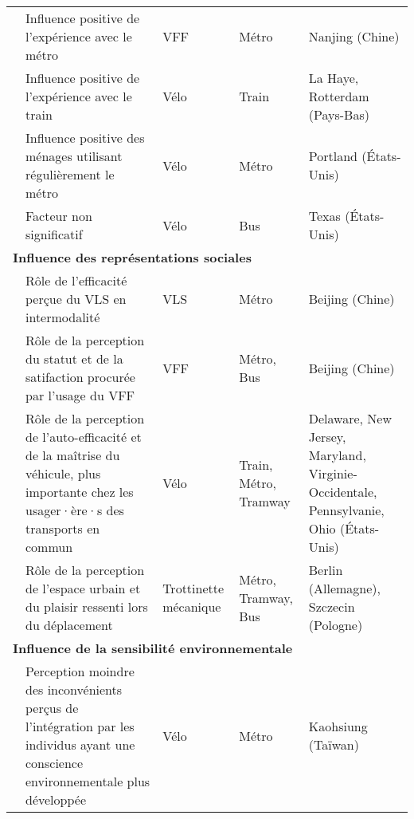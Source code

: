 \begin{longtable}{p{3cm}p{4cm}p{1.5cm}p{1.8cm}p{2.3cm}}
    \small{\textcite{liu_use_2020}}\index{Liu, Yang|pagebf} & \small{Influence positive de l'expérience avec le métro} & \small{VFF} & \small{Métro} & \small{Nanjing (Chine)}\\
    \small{\textcite{la_paix_puello_role_2021}}\index{La Paix Puello, Lissy|pagebf} & \small{Influence positive de l'expérience avec le train} & \small{Vélo} & \small{Train} & \small{La Haye, Rotterdam (Pays-Bas)}\\
    \small{\textcite{singleton_exploring_2014}}\index{Singleton, Patrick A.|pagebf} & \small{Influence positive des ménages utilisant régulièrement le métro} & \small{Vélo} & \small{Métro} & \small{Portland (États-Unis)}\\
    \small{\textcite{taylor_analysis_1996}}\index{Taylor, Dean|pagebf} & \small{Facteur non significatif} & \small{Vélo} & \small{Bus} & \small{Texas (États-Unis)}\\
    \hline
\multicolumn{5}{l}{\textbf{Influence des représentations sociales}}\\
    \small{\textcite{zhao_public_2022}}\index{Zhao, Pengjun|pagebf} & \small{Rôle de l'efficacité perçue du VLS en intermodalité} & \small{VLS} & \small{Métro} & \small{Beijing (Chine)}\\
    \small{\textcite{guo_exploring_2023}}\index{Guo, Dongbo|pagebf} & \small{Rôle de la perception du statut et de la satifaction procurée par l'usage du VFF} & \small{VFF} & \small{Métro, Bus} & \small{Beijing (Chine)}\\
    \small{\textcite{bopp_examining_2015}}\index{Bopp, Melissa|pagebf} & \small{Rôle de la perception de l'auto-efficacité et de la maîtrise du véhicule, plus importante chez les usager·ère·s des transports en commun} & \small{Vélo} & \small{Train, Métro, Tramway} & \small{Delaware, New Jersey, Maryland, Virginie-Occidentale, Pennsylvanie, Ohio (États-Unis)}\\
    \small{\textcite{kostrzewska_towards_2017}} & \small{Rôle de la perception de l'espace urbain et du plaisir ressenti lors du déplacement} & \small{Trottinette mécanique} & \small{Métro, Tramway, Bus} & \small{Berlin (Allemagne), Szczecin (Pologne)}\\
    \hline
\multicolumn{5}{l}{\textbf{Influence de la sensibilité environnementale}}\\
    \small{\textcite{cheng_evaluating_2012}}\index{Cheng, Yung-Hsiang|pagebf} & \small{Perception moindre des inconvénients perçus de l'intégration par les individus ayant une conscience environnementale plus développée} & \small{Vélo} & \small{Métro} & \small{Kaohsiung (Taïwan)}\\

\end{longtable}
